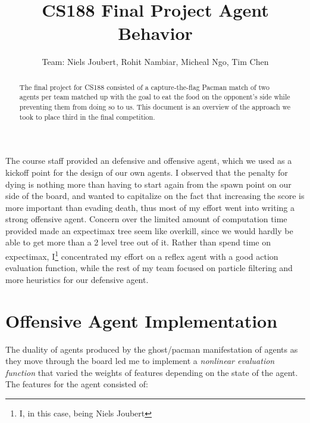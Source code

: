 \documentclass[]{article}
\title{CS188 Final Project Agent Behavior}
\author{ Team: Niels Joubert, Rohit Nambiar, Micheal Ngo, Tim Chen}
\date{}
\begin{document}
\ifpdf
{}
\else
{}
\fi

\maketitle

\begin{abstract}
The final project for CS188 consisted of a capture-the-flag Pacman match of two agents per team matched up with the goal to eat the food on the opponent's side while preventing them from doing so to us. This document is an overview of the approach we took to place third in the final competition.
\end{abstract}

\linebreak
\linebreak

\paragraph{}

The course staff provided an defensive and offensive agent, which we used as a kickoff point for the design of our own agents. I observed that the penalty for dying is nothing more than having to start again from the spawn point on our side of the board, and wanted to capitalize on the fact that increasing the score is more important than evading death, thus most of my effort went into writing a strong offensive agent. Concern over the limited amount of computation time provided made an expectimax tree seem like overkill, since we would hardly be able to get more than a 2 level tree out of it. Rather than spend time on expectimax, I\footnote{I, in this case, being Niels Joubert} concentrated my effort on a reflex agent with a good action evaluation function, while the rest of my team focused on particle filtering and more heuristics for our defensive agent.

\section{Offensive Agent Implementation}

The duality of agents produced by the ghost/pacman manifestation of agents as they move through the board led me to implement a \emph{nonlinear evaluation function} that varied the weights of features depending on the state of the agent. The features for the agent consisted of:
\end{document}
